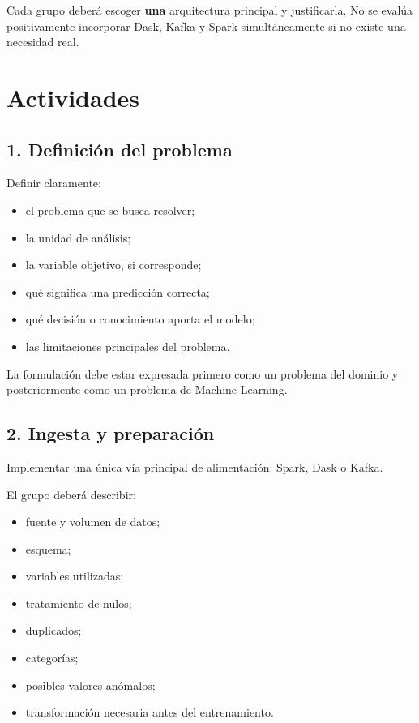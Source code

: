 \documentclass[11pt,a4paper]{article}
\begin{document}
\medskip

Cada grupo deberá escoger \textbf{una} arquitectura principal y justificarla. No se evalúa
positivamente incorporar Dask, Kafka y Spark simultáneamente si no existe una necesidad
real.

\section{Actividades}

\subsection{1. Definición del problema}

Definir claramente:

\begin{itemize}
  \item el problema que se busca resolver;
  \item la unidad de análisis;
  \item la variable objetivo, si corresponde;
  \item qué significa una predicción correcta;
  \item qué decisión o conocimiento aporta el modelo;
  \item las limitaciones principales del problema.
\end{itemize}

La formulación debe estar expresada primero como un problema del dominio y posteriormente
como un problema de Machine Learning.

\subsection{2. Ingesta y preparación}

Implementar una única vía principal de alimentación: Spark, Dask o Kafka.

El grupo deberá describir:

\begin{itemize}
  \item fuente y volumen de datos;
  \item esquema;
  \item variables utilizadas;
  \item tratamiento de nulos;
  \item duplicados;
  \item categorías;
  \item posibles valores anómalos;
  \item transformación necesaria antes del entrenamiento.
\end{itemize}
\end{document}
